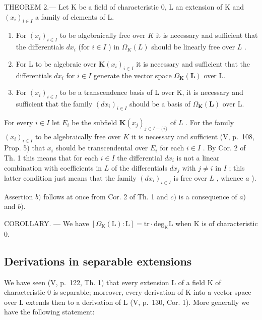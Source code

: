 THEOREM 2.--- Let K be a field of characteristic 0, L an extension of K and \((x_{i})_{i\in I}\) a family of elements of L.

\begin{enumerate}
\def\labelenumi{\alph{enumi})}
\item
  For \((x_{i})_{i\in I}\) to be algebraically free over \(K\) it is necessary and sufficient that the differentials \(dx_{i}\) (for \(i\in I\) ) in \(\Omega_K(L)\) should be linearly free over \(L\) .
\item
  For L to be algebraic over \(\mathbf{K}(x_{i})_{i\in I}\) it is necessary and sufficient that the differentials \(dx_{i}\) for \(i\in I\) generate the vector space \(\Omega_{\mathbf{K}}(\mathbf{L})\) over L.
\item
  For \((x_{i})_{i\in I}\) to be a transcendence basis of L over K, it is necessary and sufficient that the family \((dx_{i})_{i\in I}\) should be a basis of \(\Omega_{\mathbf{K}}(\mathbf{L})\) over L.
\end{enumerate}

For every \(i \in I\) let \(E_i\) be the subfield \(\mathbf{K}(x_j)_{j \in I - \{i\}}\) of \(L\) . For the family \((x_i)_{i \in I}\) to be algebraically free over \(K\) it is necessary and sufficient (V, p.~108, Prop. 5) that \(x_i\) should be transcendental over \(E_i\) for each \(i \in I\) . By Cor. 2 of Th. 1 this means that for each \(i \in I\) the differential \(dx_i\) is not a linear combination with coefficients in \(L\) of the differentials \(dx_j\) with \(j \neq i\) in \(I\) ; this latter condition just means that the family \((dx_i)_{i \in I}\) is free over \(L\) , whence \(a\) ).

Assertion \(b)\) follows at once from Cor. 2 of Th. 1 and \(c)\) is a consequence of \(a)\) and \(b).\)

COROLLARY. --- We have \([\Omega_{\mathrm{K}}(\mathrm{L}):\mathrm{L}]=\mathrm{tr}\cdot\mathrm{deg}_{\mathrm{K}}\mathrm{L}\) when K is of characteristic 0.

\subsection{Derivations in separable extensions}

We have seen (V, p.~122, Th. 1) that every extension L of a field K of characteristic 0 is separable; moreover, every derivation of K into a vector space over L extends then to a derivation of L (V, p.~130, Cor. 1). More generally we have the following statement:

